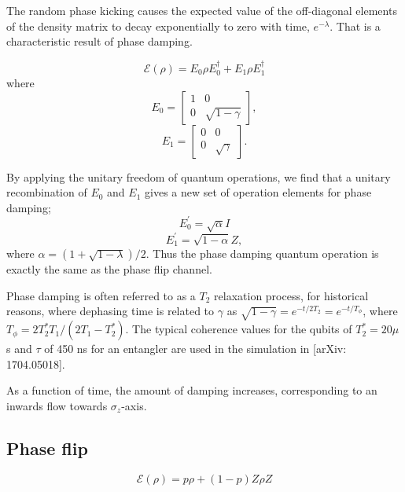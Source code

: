 \documentclass[11pt, oneside]{article}   	%
\begin{document}
The random phase kicking causes the expected value of the off-diagonal elements of the density matrix to decay exponentially to zero with time, $e^{- \lambda}$. 
That is a characteristic result of phase damping.

\begin{equation}
\mathcal{E} (\rho) = E_0 \rho E^{\dagger}_0 + E_1 \rho E^{\dagger}_1
\end{equation}
where 
\begin{equation}
E_0 = 
\begin{bmatrix}
1 & 0 \\
0 & \sqrt{1 - \gamma}
\end{bmatrix}, 
\end{equation}
\begin{equation}
E_1 = 
\begin{bmatrix}
0 & 0 \\
0 & \sqrt{\gamma}
\end{bmatrix}.
\end{equation}

By applying the unitary freedom of quantum operations, we find that a unitary recombination of $E_0$ and $E_1$ gives a new set of operation elements for phase damping;
\begin{equation}
E^{\prime}_0 = \sqrt{\alpha} I
\end{equation}
\begin{equation}
E^{\prime}_1 = \sqrt{1-\alpha} Z,
\end{equation}
where $\alpha = (1 + \sqrt{1-\lambda})/2$.
Thus the phase damping quantum operation is exactly the same as the phase flip channel.

Phase damping is often referred to as a $T_2$ relaxation process, for historical reasons, where dephasing time is related to $\gamma$ as 
$\sqrt{1 - \gamma} = e^{-t / 2T_2} = e^{-t / T_{\phi}}$, where $T_{\phi} = 2 T^*_2 T_1 / (2 T_1 - T^*_2)$.
The typical coherence values for the qubits of $T^*_2 = 20 \mu$s and $\tau$ of 450 ns for an entangler are used in the simulation in [arXiv: 1704.05018].

As a function of time, the amount of damping increases, corresponding to an inwards flow towards $\sigma_z$-axis.

\subsection{Phase flip}
\begin{equation}
\mathcal{E} (\rho) = p \rho + (1-p) Z \rho Z 
\end{equation}
\end{document}
